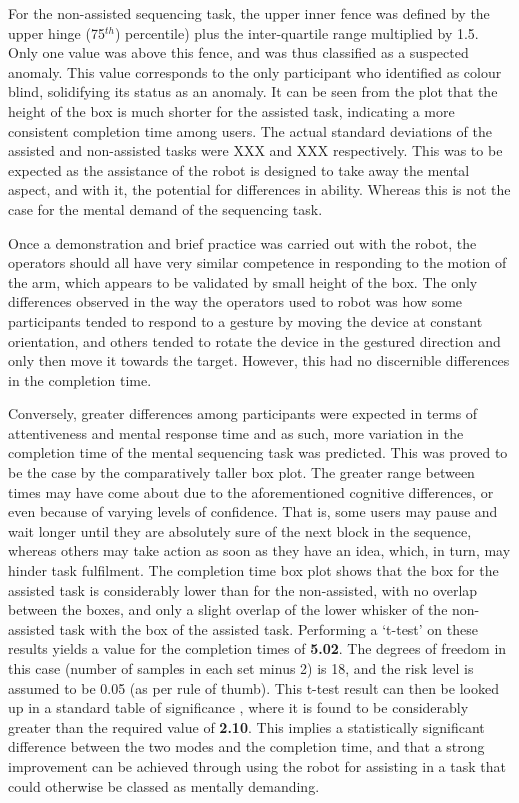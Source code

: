 \documentclass[11pt]{article}
\begin{document}
For the non-assisted sequencing task, the upper inner fence was defined by the upper hinge (75$^{th}$) percentile) plus the inter-quartile range multiplied by 1.5. Only one value was above this fence, and was thus classified as a suspected anomaly. This value corresponds to the only participant who identified as colour blind, solidifying its status as an anomaly. It can be seen from the plot that the height of the box is much shorter for the assisted task, indicating a more consistent completion time among users. The actual standard deviations of the assisted and non-assisted tasks were XXX and XXX respectively. This was to be expected as the assistance of the robot is designed to take away the mental aspect, and with it, the potential for differences in ability. Whereas this is not the case for the mental demand of the sequencing task. 

Once a demonstration and brief practice was carried out with the robot, the operators should all have very similar competence in responding to the motion of the arm, which appears to be validated by small height of the box. The only differences observed in the way the operators used to robot was how some participants tended to respond to a gesture by moving the device at constant orientation, and others tended to rotate the device in the gestured direction and only then move it towards the target. However, this had no discernible differences in the completion time. 

Conversely, greater differences among participants were expected in terms of attentiveness and mental response time and as such, more variation in the completion time of the mental sequencing task was predicted. This was proved to be the case by the comparatively taller box plot. The greater range between times may have come about due to the aforementioned cognitive differences, or even because of varying levels of confidence. That is, some users may pause and wait longer until they are absolutely sure of the next block in the sequence, whereas others may take action as soon as they have an idea, which, in turn, may hinder task fulfilment. The completion time box plot shows that the box for the assisted task is considerably lower than for the non-assisted, with no overlap between the boxes, and only a slight overlap of the lower whisker of the non-assisted task with the box of the assisted task. Performing a `t-test' on these results yields a value for the completion times of \textbf{5.02}. The degrees of freedom in this case (number of samples in each set minus 2) is 18, and the risk level is assumed to be 0.05 (as per rule of thumb). This t-test result can then be looked up in a standard table of significance \cite{ttable}, where it is found to be considerably greater than the required value of \textbf{2.10}. This implies a statistically significant difference between the two modes and the completion time, and that a strong improvement can be achieved through using the robot for assisting in a task that could otherwise be classed as mentally demanding. 
\end{document}
